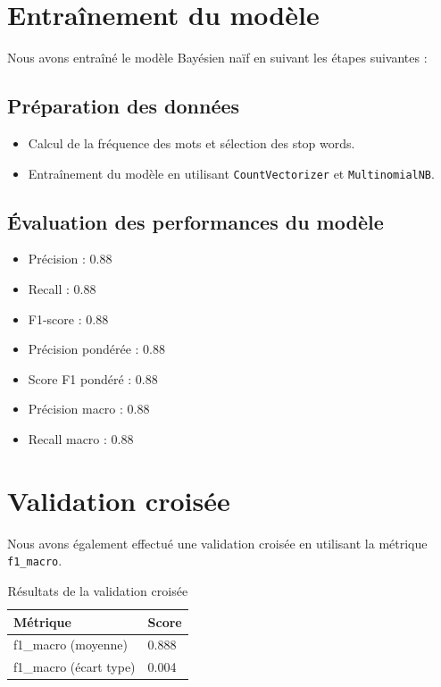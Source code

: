 \section{Entraînement du modèle}

Nous avons entraîné le modèle Bayésien naïf en suivant les étapes suivantes :

\subsection{Préparation des données}

\begin{itemize}
    \item Calcul de la fréquence des mots et sélection des stop words.
    \item Entraînement du modèle en utilisant \texttt{CountVectorizer} et \texttt{MultinomialNB}.
\end{itemize}

\subsection{Évaluation des performances du modèle}

\begin{itemize}
    \item Précision : 0.88
    \item Recall : 0.88
    \item F1-score : 0.88
    \item Précision pondérée : 0.88
    \item Score F1 pondéré : 0.88
    \item Précision macro : 0.88
    \item Recall macro : 0.88
\end{itemize}

\section{Validation croisée}

Nous avons également effectué une validation croisée en utilisant la métrique \texttt{f1\_macro}.

\begin{table}[h]
    \centering
    \begin{tabular}{|l|l|}
    \hline
    \textbf{Métrique} & \textbf{Score} \\ \hline
    f1\_macro (moyenne) & 0.888 \\ \hline
    f1\_macro (écart type) & 0.004 \\ \hline
    \end{tabular}
    \caption{Résultats de la validation croisée}
\end{table}

